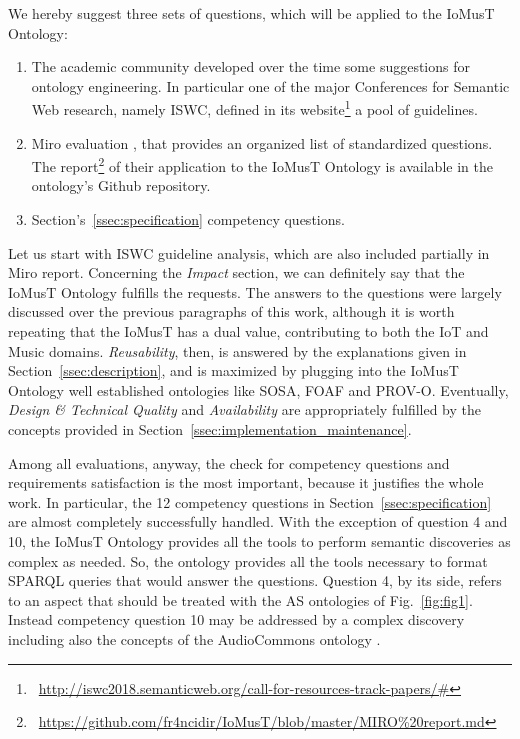 We hereby suggest three sets of questions, which will be applied to the IoMusT Ontology:
\begin{enumerate}
    \item The academic community developed over the time some suggestions for ontology engineering. In particular one of the major Conferences for Semantic Web research, namely ISWC, defined in its website\footnote{\faLink~\url{http://iswc2018.semanticweb.org/call-for-resources-track-papers/\#}} a pool of guidelines.
    \item Miro evaluation \cite{matentzoglu2018miro}, that provides an organized list of standardized questions. The report\footnote{\faGithub~\url{https://github.com/fr4ncidir/IoMusT/blob/master/MIRO\%20report.md}} of their application to the IoMusT Ontology is available in the ontology's Github repository.
    \item Section's~\ref{ssec:specification} competency questions.
\end{enumerate}

Let us start with ISWC guideline analysis, which are also included partially in Miro report. Concerning the \textit{Impact} section, we can definitely say that the IoMusT Ontology fulfills the requests. The answers to the questions were largely discussed over the previous paragraphs of this work, although it is worth repeating that the IoMusT has a dual value, contributing to both the IoT and Music domains. \textit{Reusability}, then, is answered by the explanations given in Section~\ref{ssec:description}, and is maximized by plugging into the IoMusT Ontology well established ontologies like SOSA, FOAF and \mbox{PROV-O}. Eventually, \textit{Design \& Technical Quality} and \textit{Availability} are appropriately fulfilled by the concepts provided in Section~\ref{ssec:implementation_maintenance}.

Among all evaluations, anyway, the check for competency questions and requirements satisfaction is the most important, because it justifies the whole work. In particular, the 12 competency questions in Section~\ref{ssec:specification} are almost completely successfully handled. With the exception of question 4 and 10, the IoMusT Ontology provides all the tools to perform semantic discoveries as complex as needed. So, the ontology provides all the tools necessary to format SPARQL queries that would answer the questions. Question 4, by its side, refers to an aspect that should be treated with the AS ontologies of Fig.~\ref{fig:fig1}. Instead competency question 10 may be addressed by a complex discovery including also the concepts of the AudioCommons ontology .

